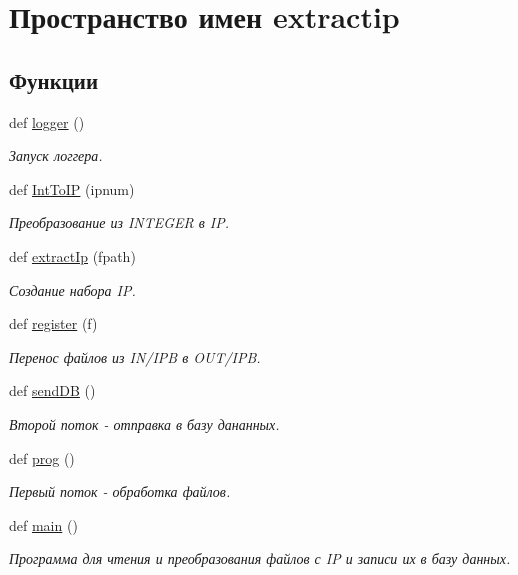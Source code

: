 \hypertarget{namespaceextractip}{}\section{Пространство имен extractip}
\label{namespaceextractip}
\subsection*{Функции}
\begin{DoxyCompactItemize}
\item 
def \hyperlink{namespaceextractip_ad06d305b46e8793c42d3b69a019b024a}{logger} ()
\begin{DoxyCompactList}\small\item\em Запуск логгера. \end{DoxyCompactList}\item 
def \hyperlink{namespaceextractip_a027ec0c1479a189825c3ddcfefa0622d}{Int\+To\+IP} (ipnum)
\begin{DoxyCompactList}\small\item\em Преобразование из I\+N\+T\+E\+G\+ER в IP. \end{DoxyCompactList}\item 
def \hyperlink{namespaceextractip_a618ef8385421a257b0d4e90b39fd6050}{extract\+Ip} (fpath)
\begin{DoxyCompactList}\small\item\em Создание набора IP. \end{DoxyCompactList}\item 
def \hyperlink{namespaceextractip_a93e2b267d1b4fe1cef5c09f3b66217c0}{register} (f)
\begin{DoxyCompactList}\small\item\em Перенос файлов из I\+N/\+I\+PB в O\+U\+T/\+I\+PB. \end{DoxyCompactList}\item 
def \hyperlink{namespaceextractip_a4eeaa038e0dc125d55e221ea90a5a466}{send\+DB} ()
\begin{DoxyCompactList}\small\item\em Второй поток -\/ отправка в базу дананных. \end{DoxyCompactList}\item 
def \hyperlink{namespaceextractip_a3683febfdca5f525d87e4066e121b146}{prog} ()
\begin{DoxyCompactList}\small\item\em Первый поток -\/ обработка файлов. \end{DoxyCompactList}\item 
def \hyperlink{namespaceextractip_a4400b3ea86ebdf89264ad2424ca152e4}{main} ()
\begin{DoxyCompactList}\small\item\em Программа для чтения и преобразования файлов с IP и записи их в базу данных. \end{DoxyCompactList}\end{DoxyCompactItemize}

